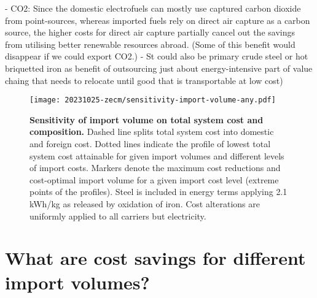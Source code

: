 - CO2: Since the domestic electrofuels can mostly use captured carbon dioxide from point-sources, whereas imported fuels rely on direct air capture as a carbon source, the higher costs for direct air capture partially cancel out the savings from utilising better renewable resources abroad. (Some of this benefit would disappear if we could export CO2.)
- St could also be primary crude steel or hot briquetted iron as benefit of outsourcing just about energy-intensive part of value chaing that needs to relocate until good that is transportable at low cost)


\begin{figure*}
    \texttt{[image: 20231025-zecm/sensitivity-import-volume-any.pdf]}
    \caption{\textbf{Sensitivity of import volume on total system cost and composition.} 
        Dashed line splits total system cost into domestic and foreign cost.
        Dotted lines indicate the profile of lowest total system cost attainable for given import volumes and different levels of import costs.
        Markers denote the maximum cost reductions and cost-optimal import volume for a given import cost level (extreme points of the profiles).
        Steel is included in energy terms applying 2.1 kWh/kg as released by oxidation of iron.
        Cost alterations are uniformly applied to all carriers but electricity.
    }
    \label{fig:sensitivity-volume}
\end{figure*}

\section*{What are cost savings for different import volumes?}

